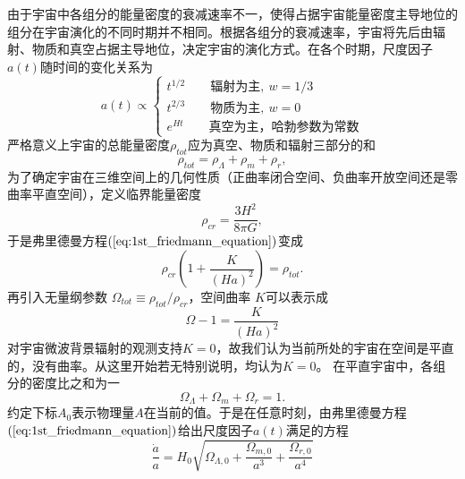 由于宇宙中各组分的能量密度的衰减速率不一，使得占据宇宙能量密度主导地位的组分在宇宙演化的不同时期并不相同。根据各组分的衰减速率，宇宙将先后由辐射、物质和真空占据主导地位，决定宇宙的演化方式。在各个时期，尺度因子$a(t)$随时间的变化关系为
\begin{equation}
    a(t)\propto 
    \begin{cases}
        t^{1/2}\qquad \text{辐射为主},\ w=1/3 \\
        t^{2/3}\qquad \text{物质为主},\ w=0 \\
        e^{Ht}\qquad \text{真空为主，哈勃参数为常数}
    \end{cases}
\end{equation}
严格意义上宇宙的总能量密度$\rho_{tot}$应为真空、物质和辐射三部分的和
\begin{equation}
    \rho_{tot} = \rho_{\Lambda}+\rho_m+\rho_r,
\end{equation}
为了确定宇宙在三维空间上的几何性质（正曲率闭合空间、负曲率开放空间还是零曲率平直空间），定义临界能量密度 
\begin{equation}
    \label{eq:critical_rho}
    \rho_{cr} = \frac{3H^2}{8\pi G},
\end{equation}
于是弗里德曼方程$(\ref{eq:1st_friedmann_equation})$变成
\begin{equation}
    \rho_{cr}\left(1 + \frac{K}{{(Ha)}^2}\right) = \rho_{tot}.
\end{equation}
再引入无量纲参数 $\Omega_{tot}\equiv
\rho_{tot}/\rho_{cr}$，空间曲率 $K$可以表示成
\begin{equation}\label{eq:flatness}
    \Omega - 1 = \frac{K}{{(Ha)}^2} 
\end{equation}
对宇宙微波背景辐射的观测支持$K=0$，故我们认为当前所处的宇宙在空间是平直的，没有曲率。从这里开始若无特别说明，均认为$K=0$。
在平直宇宙中，各组分的密度比之和为一
\begin{equation}
    \Omega_{\Lambda}+\Omega_m+\Omega_r=1.
\end{equation}
约定下标$A_0$表示物理量$A$在当前的值。于是在任意时刻，由弗里德曼方程$(\ref{eq:1st_friedmann_equation})$给出尺度因子$a(t)$满足的方程
\begin{equation}
    \frac{\dot{a}}{a} =
    H_0\sqrt{\Omega_{\Lambda,0}+\frac{\Omega_{m,0}}{a^3}+\frac{\Omega_{r,0}}{a^4}}
\end{equation}

